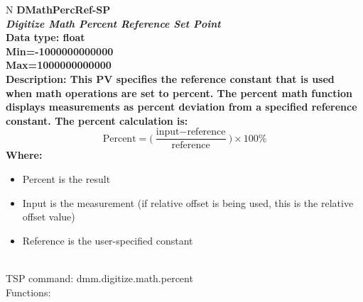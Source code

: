 \documentclass[openany]{article}
\begin{document}
		\begin{tabular}{N}
			\hline
			\bfseries DMathPercRef-SP\label{pv:dmathpercref-sp} \\ \hline
			\emph{Digitize Math Percent Reference Set Point} \\
			Data type: float \\
			Min=-1000000000000 \\
			Max=1000000000000 \\
			Description: This PV specifies the reference constant that is used when math operations are set to percent. The percent math function displays measurements as percent deviation from a specified reference constant. The percent calculation is: $$ \text{Percent} = \bigg(\frac{\text{input} - \text{reference}}{\text{reference}}\bigg)\times 100\% $$ Where: \begin{itemize} \item Percent is the result \item Input is the measurement (if relative offset is being used, this is the relative offset value) \item Reference is the user-specified constant \end{itemize} \\
			TSP command: dmm.digitize.math.percent \\
			Functions: \\
			\arrayrulecolor{\FuncTableBorderColor}

		\end{tabular}
\end{document}
